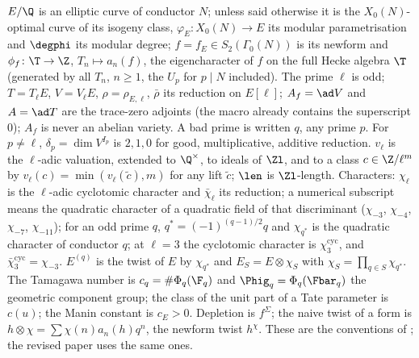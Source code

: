\begin{sloppypar}
\begin{convention}\label{conv:paper:standing}
$E/\Q$ is an elliptic curve of conductor $N$; unless said otherwise it is the $X_0(N)$-optimal curve of its isogeny class, $\varphi_E\colon X_0(N)\to E$ its
modular parametrisation and $\degphi$ its modular degree; $f=f_E\in S_2(\Gamma_0(N))$ is its newform and $\phi_f\colon\T\to\Z$, $T_n\mapsto a_n(f)$, the eigencharacter of
$f$ on the full Hecke algebra $\T$ (generated by all $T_n$, $n\ge1$, the $U_p$ for $p\mid N$ included). The prime $\ell$ is odd; $T=T_\ell E$, $V=V_\ell E$, $\rho=\rho_{E,\ell}$, $\bar\rho$ its
reduction on $E[\ell]$; $A_f=\ad V$ and $A=\ad T$ are the trace-zero adjoints (the macro already contains the superscript $0$); $A_f$ is never an abelian
variety. A bad prime is written $q$, any prime $p$. For $p\ne\ell$, $\delta_p=\dim V^{I_p}$ is $2,1,0$ for good, multiplicative, additive reduction. $v_\ell$ is the
$\ell$-adic valuation, extended to $\Q^\times$, to ideals of $\Zl$, and to a class $c\in\Z/\ell^m$ by $v_\ell(c)=\min(v_\ell(\tilde c),m)$ for any lift $\tilde c$; $\len$ is
$\Zl$-length. Characters: $\chi_\ell$ is the $\ell$-adic cyclotomic character and $\bar\chi_\ell$ its reduction; a numerical subscript means the quadratic
character of a quadratic field of that discriminant ($\chi_{-3}$, $\chi_{-4}$, $\chi_{-7}$, $\chi_{-11}$); for an odd prime $q$, $q^*=(-1)^{(q-1)/2}q$ and $\chi_{q^*}$ is the
quadratic character of conductor $q$; at $\ell=3$ the cyclotomic character is $\chi_3^{\mathrm{cyc}}$, and $\bar\chi_3^{\mathrm{cyc}}=\chi_{-3}$. $E^{(q)}$ is the twist of $E$ by
$\chi_{q^*}$ and $E_S=E\otimes\chi_S$ with $\chi_S=\prod_{q\in S}\chi_{q^*}$. The Tamagawa number is $c_q=\#\Phi_q(\F_q)$ and $\Phig_q=\Phi_q(\Fbar_q)$ the geometric component
group; the class of the unit part of a Tate parameter is $c(u)$; the Manin constant is $c_E>0$. Depletion is $f^\Sigma$; the naive twist of a form is
$h\otimes\chi=\sum\chi(n)a_n(h)q^n$, the newform twist $h^\chi$. These are the conventions of ; the revised paper uses the same ones.
\end{convention}


\end{sloppypar}
